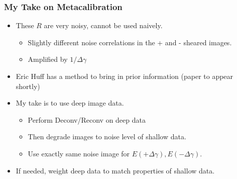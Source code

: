 \documentclass{beamer}
\begin{document}
\frame
{
    \frametitle{My Take on Metacalibration}

 
    \begin{itemize}

        \item These {\color{gold} $R$} are very noisy, cannot be used naively.
            \begin{itemize}

                \item Slightly different noise correlations in the + and -
                    sheared images.
                \item Amplified by {\color{gold} $1/\Delta \gamma$}
            \end{itemize}

        \item Eric Huff has a method to bring in prior information (paper
            to appear shortly)

        \item My take is to use deep image data.
            \begin{itemize}
                \item Perform Deconv/Reconv on deep data
                \item Then degrade images to noise level of shallow data.
                \item Use exactly same noise image for 
                    {\color{gold} $E(+\Delta\gamma), E(-\Delta\gamma)$}.
            \end{itemize}

        \item If needed, weight deep data to match properties of shallow data.

    \end{itemize}

}
\end{document}
